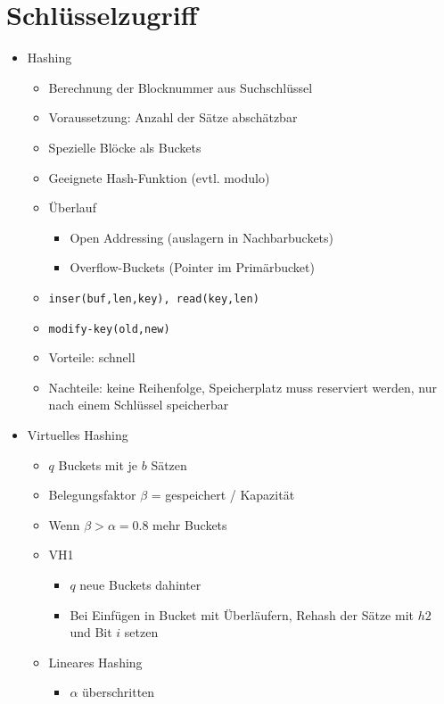 \documentclass[11pt, paper=a4, twocolumn]{scrartcl}
\begin{document}
	\section{Schlüsselzugriff}
		\begin{itemize}
			\item Hashing
				\begin{itemize}
					\item Berechnung der Blocknummer aus Suchschlüssel
					\item Voraussetzung: Anzahl der Sätze abschätzbar
					\item Spezielle Blöcke als Buckets
					\item Geeignete Hash-Funktion (evtl. modulo)
					\item Überlauf
						\begin{itemize}
							\item Open Addressing (auslagern 
								in Nachbarbuckets)
							\item Overflow-Buckets (Pointer im 
								Primärbucket)
						\end{itemize}
					\item \texttt{inser(buf,len,key), read(key,len)}
					\item \texttt{modify-key(old,new)}
					\item Vorteile: schnell
					\item Nachteile: keine Reihenfolge, Speicherplatz 
						muss reserviert werden, nur nach einem 
						Schlüssel speicherbar
				\end{itemize}
			\item Virtuelles Hashing
				\begin{itemize}
					\item $q$ Buckets mit je $b$ Sätzen
					\item Belegungsfaktor $\beta$ = gespeichert / 
						Kapazität
					\item Wenn $\beta>\alpha=0.8$ mehr Buckets
					\item VH1
						\begin{itemize}
							\item $q$ neue Buckets dahinter
							\item Bei Einfügen in Bucket mit 
								Überläufern, Rehash der 
								Sätze mit $h2$ und Bit 
								$i$ setzen
						\end{itemize}
					\item Lineares Hashing
						\begin{itemize}
							\item $\alpha$ überschritten

\end{itemize}
\end{itemize}
\end{itemize}
\end{document}
